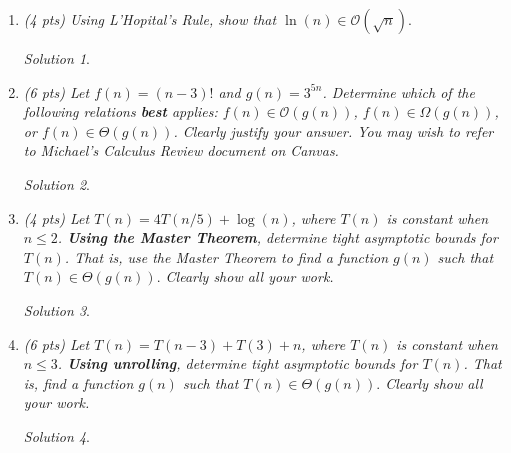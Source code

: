 \documentclass[12pt]{article}
\theoremstyle{remark}
\newtheorem*{solution}{Solution}
\newcommand{\makenonemptybox}[2]{%
\item[]
\fbox{%
\parbox[c][#1][t]{\dimexpr\linewidth-2\fboxsep-2\fboxrule}{
  \hrule width \hsize height 0pt
  #2
 }%
}%
\par\vspace{\ht\strutbox}
}
\begin{document}
\hrulefill

\begin{enumerate}


\pagebreak
\item {\itshape (4 pts) Using L'Hopital's Rule, show that $\ln(n) \in \mathcal{O}(\sqrt{n}).$}
\begin{solution}
\end{solution}

\pagebreak
\item {\itshape (6 pts) Let $f(n) = (n-3)!$ and $g(n) = 3^{5n}$. Determine which of the following relations \textbf{best} applies: $f(n) \in \mathcal{O}(g(n))$, $f(n) \in \Omega(g(n))$, or $f(n) \in \Theta(g(n))$. Clearly justify your answer. You may wish to refer to Michael's Calculus Review document on Canvas.}
\begin{solution}
\end{solution}


\pagebreak


\pagebreak
\item {\itshape (4 pts) Let $T(n) = 4T(n/5) + \log(n)$, where $T(n)$ is constant when $n \leq 2$. \textbf{Using the Master Theorem}, determine tight asymptotic bounds for $T(n)$. That is, use the Master Theorem to find a function $g(n)$ such that $T(n) \in \Theta(g(n)).$ Clearly show all your work.}
\begin{solution}
\end{solution}


\pagebreak
\item {\itshape (6 pts) Let $T(n) = T(n-3) + T(3) + n$, where $T(n)$ is constant when $n \leq 3$. \textbf{Using unrolling}, determine tight asymptotic bounds for $T(n)$. That is, find a function $g(n)$ such that $T(n) \in \Theta(g(n)).$ Clearly show all your work.}
\begin{solution}
\end{solution}


\end{enumerate}
\end{document}
